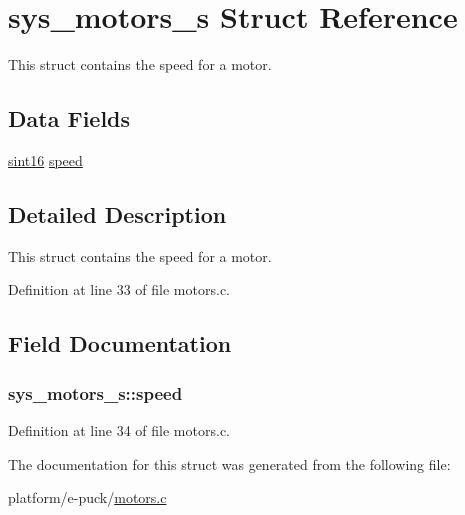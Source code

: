 \hypertarget{structsys__motors__s}{}\section{sys\+\_\+motors\+\_\+s Struct Reference}
\label{structsys__motors__s}


This struct contains the speed for a motor.  


\subsection*{Data Fields}
\begin{DoxyCompactItemize}
\item 
\hyperlink{definitions_8h_a74df79fde3c518e55b29ce6360a9c76e}{sint16} \hyperlink{structsys__motors__s_af052a7c6ad50ff8e0acaa8293b37f659}{speed}
\end{DoxyCompactItemize}


\subsection{Detailed Description}
This struct contains the speed for a motor. 

Definition at line 33 of file motors.\+c.



\subsection{Field Documentation}
\hypertarget{structsys__motors__s_af052a7c6ad50ff8e0acaa8293b37f659}{}
\subsubsection[{speed}]{ sys\+\_\+motors\+\_\+s\+::speed}\label{structsys__motors__s_af052a7c6ad50ff8e0acaa8293b37f659}


Definition at line 34 of file motors.\+c.



The documentation for this struct was generated from the following file\+:\begin{DoxyCompactItemize}
\item 
platform/e-\/puck/\hyperlink{motors_8c}{motors.\+c}\end{DoxyCompactItemize}

